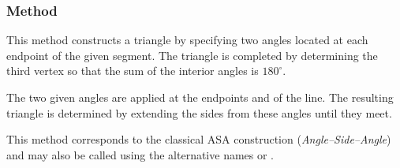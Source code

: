 \vspace{1em}
\begin{minipage}{.5\textwidth}
\begin{center}
\end{center}

\end{minipage}
\begin{minipage}{.5\textwidth}
\begin{tkzexample}
\end{tkzexample}
\end{minipage}


\subsubsection{Method } %
\label{ssub:triangle_with_two__angles}

This method constructs a triangle by specifying two angles located at each endpoint of the given segment. The triangle is completed by determining the third vertex so that the sum of the interior angles is $180^\circ$.

\medskip
\noindent
The two given angles are applied at the endpoints  and  of the line. The resulting triangle is determined by extending the sides from these angles until they meet.

\medskip
\noindent
This method corresponds to the classical ASA construction (\textit{Angle–Side–Angle}) and may also be called using the alternative names  or .

\vspace{1em}

